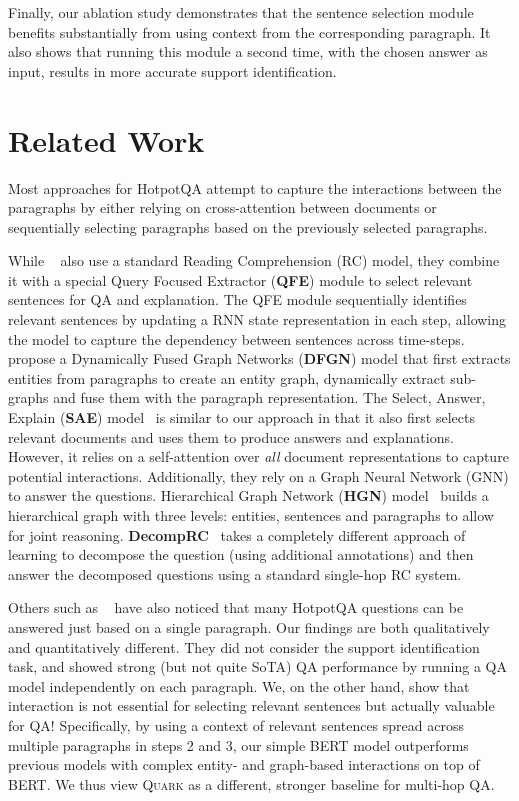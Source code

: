 \documentclass[11pt,a4paper]{article}
\newcommand\model{\textsc{Quark}\xspace}
\newcommand{\hpqa}{HotpotQA\xspace}
\newcommand{\namecite}[1]{\citeauthor{#1}~\shortcite{#1}}
\begin{document}
Finally, our ablation study demonstrates that the sentence selection module benefits substantially from using context from the corresponding paragraph. It also shows that running this module a second time, with the chosen answer as input, results in more accurate support identification.

\section{Related Work}

Most approaches for \hpqa attempt to capture the interactions between the paragraphs by either relying on cross-attention between documents or sequentially selecting paragraphs based on the previously selected paragraphs.

While \namecite{qfe} also use a standard Reading Comprehension (RC) model, they combine it with a special Query Focused Extractor (\textbf{QFE}) module to select relevant sentences for QA and explanation. The QFE module sequentially identifies relevant sentences by updating a RNN state representation in each step, allowing the model to capture the dependency between sentences across time-steps. \namecite{dfgn} propose a Dynamically Fused Graph Networks (\textbf{DFGN}) model that first extracts entities from paragraphs to create an entity graph, dynamically extract sub-graphs and fuse them with the paragraph representation. 
The Select, Answer, Explain (\textbf{SAE}) model~\cite{sae} is similar to our approach in that it also first selects relevant documents and uses them to produce answers and explanations. However, it relies on a self-attention over \emph{all} document representations to capture potential interactions. Additionally, they rely on a Graph Neural Network (GNN) to answer the questions. Hierarchical Graph Network (\textbf{HGN}) model~\cite{hgn} builds a hierarchical graph with three levels: entities, sentences and paragraphs to allow for joint reasoning.
\textbf{DecompRC}~\cite{decomprc} takes a completely different approach of learning to decompose the question (using additional annotations) and then answer the decomposed questions using a standard single-hop RC system.

Others such as \namecite{Min2019CompositionalQD} have also noticed that many \hpqa questions can be answered just based on a single paragraph. Our findings are both qualitatively and quantitatively different. They did not consider the support identification task, and showed strong (but not quite SoTA) QA performance by running a QA model independently on each paragraph. We, on the other hand, show that interaction is not essential for selecting relevant sentences but actually valuable for QA! Specifically, by using a context of relevant sentences spread across multiple paragraphs in steps 2 and 3, our simple BERT model outperforms previous models with complex entity- and graph-based interactions on top of BERT. We thus view \model as a different, stronger baseline for multi-hop QA.
\end{document}
